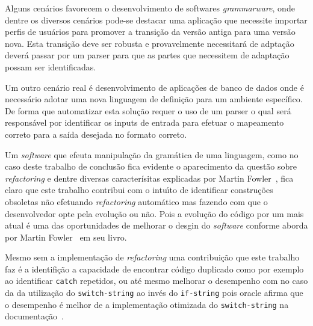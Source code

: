 Alguns cen\'{a}rios favorecem o desenvolvimento de softwares {\it grammarware}, onde dentre os diversos cen\'{a}rios pode-se destacar uma aplicaç\~{a}o que necessite importar perfis de usu\'{a}rios para promover a transiç\~{a}o da vers\~{a}o antiga para uma vers\~{a}o nova. Esta transiç\~{a}o deve ser robusta e provavelmente necessitar\'{a} de adptaç\~{a}o dever\'{a} passar por um parser para que as partes que necessitem de adaptaç\~{a}o possam ser identificadas.

Um outro cen\'{a}rio real \'{e} desenvolvimento de aplicaç\~{o}es de banco de dados onde \'{e} necess\'{a}rio adotar uma nova linguagem de definiç\~{a}o para um ambiente espec\'{i}fico. De forma que automatizar esta soluç\~{a}o requer o uso de um parser o qual ser\'{a} respons\'{a}vel por identificar os inputs de entrada para efetuar o mapeamento correto para a sa\'{i}da desejada no formato correto.


Um \textit{software} que efeuta manipula\c{c}\~{a}o da gram\'{a}tica de uma linguagem, como no caso deste trabalho de conclus\~{a}o fica evidente o aparecimento da quest\~{a}o sobre \textit{refactoring} e dentre diversas caracter\'{i}sitas explicadas por Martin Fowler~\cite{martinFowlerRafactoring}, fica claro que este trabalho contribui com o intu\'{\i}to de identificar constru\c{c}\~{o}es obsoletas n\~{a}o efetuando \textit{refactoring} autom\'{a}tico mas fazendo  com que o desenvolvedor opte pela evolu\c{c}\~{a}o ou n\~{a}o. Pois a evolu\c{c}\~{a}o do c\'{o}digo por um mais atual \'{e} uma das oportunidades de melhorar o desgin do \textit{software} conforme aborda por Martin Fowler~\cite{martinFowlerRafactoring} em seu livro.

Mesmo sem a implementa\c{c}\~{a}o de \textit{refactoring} uma contribui\c{c}\~{a}o que este trabalho faz \'{e} a identifi\c{c}\~{a}o a capacidade de encontrar c\'{o}digo duplicado como por exemplo ao identificar \texttt{catch} repetidos, ou at\'{e} mesmo melhorar o desempenho com no caso da da utilizaç\~{a}o do \texttt{switch-string} ao inv\'{e}s do \texttt{if-string} pois oracle afirma que o desempenho \'{e} melhor de a implementa\c{c}\~{a}o otimizada do \texttt{switch-string} na documenta\c{c}\~{a}o~\cite{docSwitch}.





